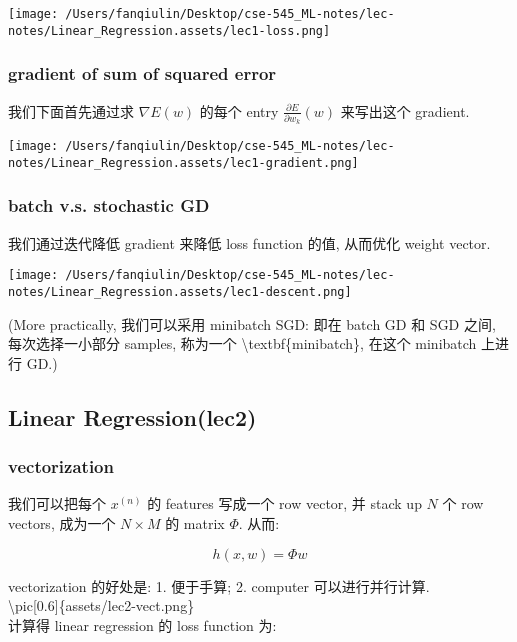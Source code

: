 \documentclass[
]{article}
\begin{document}
\texttt{[image: /Users/fanqiulin/Desktop/cse-545\_ML-notes/lec-notes/Linear\_Regression.assets/lec1-loss.png]}

\hypertarget{gradient-of-sum-of-squared-error}{%
\subsubsection{gradient of sum of squared
error}\label{gradient-of-sum-of-squared-error}}

我们下面首先通过求 \(\nabla E(w)\) 的每个 entry
\(\frac{\partial E}{\partial w_k}(w)\) 来写出这个 gradient.

\texttt{[image: /Users/fanqiulin/Desktop/cse-545\_ML-notes/lec-notes/Linear\_Regression.assets/lec1-gradient.png]}

\hypertarget{batch-vs-stochastic-gd}{%
\subsubsection{batch v.s. stochastic GD}\label{batch-vs-stochastic-gd}}

我们通过迭代降低 gradient 来降低 loss function 的值, 从而优化 weight
vector.

\texttt{[image: /Users/fanqiulin/Desktop/cse-545\_ML-notes/lec-notes/Linear\_Regression.assets/lec1-descent.png]}

(More practically, 我们可以采用 minibatch SGD: 即在 batch GD 和 SGD
之间, 每次选择一小部分 samples, 称为一个
\textbackslash textbf\{minibatch\}, 在这个 minibatch 上进行 GD.)

\hypertarget{linear-regressionlec2}{%
\subsection{Linear Regression(lec2)}\label{linear-regressionlec2}}

\hypertarget{vectorization}{%
\subsubsection{vectorization}\label{vectorization}}

我们可以把每个 \(x^{(n)}\) 的 features 写成一个 row vector, 并 stack up
\(N\) 个 row vectors, 成为一个 \(N\times M\) 的 matrix \(\Phi\). 从而:

\[h(x,w) = \Phi w\]

vectorization 的好处是: 1. 便于手算; 2. computer 可以进行并行计算.\\
\textbackslash pic{[}0.6{]}\{assets/lec2-vect.png\}\\
计算得 linear regression 的 loss function 为:
\end{document}
